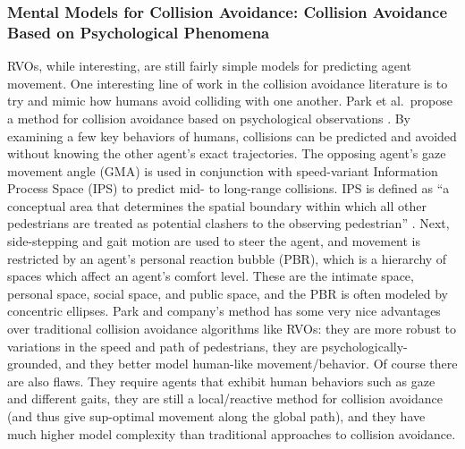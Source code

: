 \documentclass[tog]{acmsiggraph}
\begin{document}
\subsubsection{Mental Models for Collision Avoidance: Collision Avoidance Based on Psychological Phenomena}
RVOs, while interesting, are still fairly simple models for predicting agent movement. One interesting line of work in the collision avoidance literature is to try and mimic how humans avoid colliding with one another. Park et al.\ propose a method for collision avoidance based on psychological observations \cite{park2013psych}. By examining a few key behaviors of humans, collisions can be predicted and avoided without knowing the other agent's exact trajectories. The opposing agent's gaze movement angle (GMA) is used in conjunction with speed-variant Information Process Space (IPS) to predict mid- to long-range collisions. IPS is defined as ``a conceptual area that determines the spatial boundary within which all other pedestrians are treated as potential clashers to the observing pedestrian'' \cite{park2013psych}. Next, side-stepping and gait motion are used to steer the agent, and movement is restricted by an agent's personal reaction bubble (PBR), which is a hierarchy of spaces which affect an agent's comfort level. These are the intimate space, personal space, social space, and public space, and the PBR is often modeled by concentric ellipses. Park and company's method has some very nice advantages over traditional collision avoidance algorithms like RVOs: they are more robust to variations in the speed and path of pedestrians, they are psychologically-grounded, and they better model human-like movement/behavior. Of course there are also flaws. They require agents that exhibit human behaviors such as gaze and different gaits, they are still a local/reactive method for collision avoidance (and thus give sup-optimal movement along the global path), and they have much higher model complexity than traditional approaches to collision avoidance.



%
%
%
%
\end{document}
